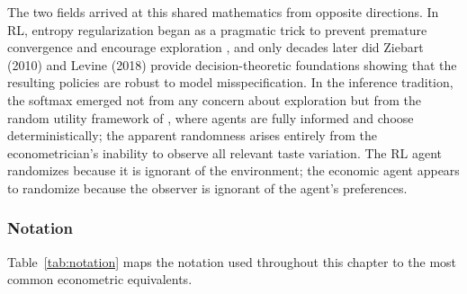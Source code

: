 The two fields arrived at this shared mathematics from opposite directions. In RL, entropy regularization began as a pragmatic trick to prevent premature convergence and encourage exploration \citep{WilliamsPeng1991}, and only decades later did Ziebart (2010) and Levine (2018) provide decision-theoretic foundations showing that the resulting policies are robust to model misspecification. In the inference tradition, the softmax emerged not from any concern about exploration but from the random utility framework of \citet{McFadden1974}, where agents are fully informed and choose deterministically; the apparent randomness arises entirely from the econometrician's inability to observe all relevant taste variation. The RL agent randomizes because it is ignorant of the environment; the economic agent appears to randomize because the observer is ignorant of the agent's preferences.

\subsubsection{Notation}
\label{subsec:notation}

Table~\ref{tab:notation} maps the notation used throughout this chapter to the most common econometric equivalents.


